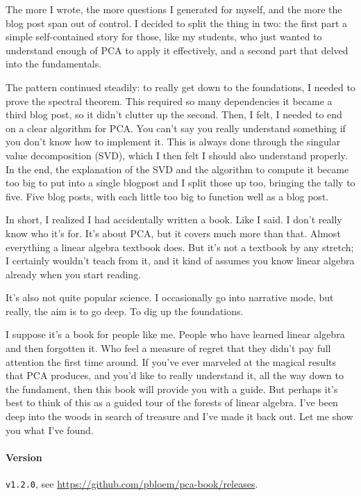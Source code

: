 \documentclass{pca}
\theoremstyle{theorem}
\theoremstyle{proof}
\begin{document}
The more I wrote, the more questions I generated for myself, and the more the blog post span out of control. I decided to split the thing in two: the first part a simple self-contained story for those, like my students, who just wanted to understand enough of PCA to apply it effectively, and a second part that delved into the fundamentals. 

The pattern continued steadily: to really get down to the foundations, I needed to prove the spectral theorem. This required so many dependencies it became a third blog post, so it didn't clutter up the second. Then, I felt, I needed to end on a clear algorithm for PCA. You can't say you really understand something if you don't know how to implement it. This is always done through the singular value decomposition (SVD), which I then felt I should also understand properly. In the end, the explanation of the SVD and the algorithm to compute it became too big to put into a single blogpost and I split those up too, bringing the tally to five. Five blog posts, with each little too big to function well as a blog post.

In short, I realized I had accidentally written a book. Like I said. I don't really know who it's for. It's about PCA, but it covers much more than that. Almost everything a linear algebra textbook does. But it's not a textbook by any stretch; I certainly wouldn't teach from it, and it kind of assumes you know linear algebra already when you start reading.

It's also not quite popular science. I occasionally go into narrative mode, but really, the aim is to go deep. To dig up the foundations.

 I suppose it's a book for people like me. People who have learned linear algebra and then forgotten it. Who feel a measure of regret that they didn't pay full attention the first time around. If you've ever marveled at the magical results that PCA produces, and you'd like to really understand it, all the way down to the fundament, then this book will provide you with a guide. But perhaps it's best to think of this as a guided tour of the forests of linear algebra. I've been deep into the woods in search of treasure and I've made it back out. Let me show you what I've found.
 
\enlargethispage{5em}

\paragraph{Version} \texttt{v1.2.0}, see \url{https://github.com/pbloem/pca-book/releases}.
\end{document}
